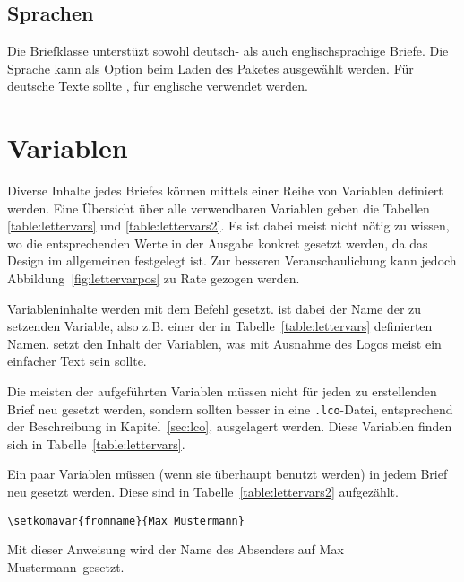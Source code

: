 \subsection{Sprachen}

\begin{Declaration}
\end{Declaration}

Die Briefklasse unterstüzt sowohl deutsch- als auch englischsprachige Briefe.
Die Sprache kann als Option beim Laden des Paketes  ausgewählt werden.
Für deutsche Texte sollte , für englische 
verwendet werden.


\section{Variablen}\label{sec:lettervars}

Diverse Inhalte jedes Briefes können mittels einer Reihe von Variablen
definiert werden.
Eine Übersicht über alle verwendbaren Variablen geben die
Tabellen \ref{table:lettervars} und \ref{table:lettervars2}.
Es ist dabei meist nicht nötig zu wissen,
wo die entsprechenden Werte in der Ausgabe konkret gesetzt werden,
da das Design im allgemeinen festgelegt ist.
Zur besseren Veranschaulichung kann jedoch
Abbildung~\ref{fig:lettervarpos} zu Rate gezogen werden.

\begin{Declaration}
\end{Declaration}

Variableninhalte werden mit dem Befehl  gesetzt.
 ist dabei der Name der zu setzenden Variable, also z.B. einer der in
Tabelle~\ref{table:lettervars} definierten Namen.  setzt den
Inhalt der Variablen, was mit Ausnahme des Logos meist ein einfacher
Text sein sollte.

Die meisten der aufgeführten Variablen müssen nicht für jeden zu erstellenden
Brief neu gesetzt werden, sondern sollten besser in eine \texttt{.lco}-Datei,
entsprechend der Beschreibung in Kapitel~\ref{sec:lco}, ausgelagert werden.
Diese Variablen finden sich in Tabelle~\ref{table:lettervars}.

Ein paar Variablen müssen (wenn sie überhaupt benutzt werden) in jedem Brief
neu gesetzt werden. Diese sind in Tabelle~\ref{table:lettervars2} aufgezählt.

\begin{example}
\begin{lstlisting}
\setkomavar{fromname}{Max Mustermann}
\end{lstlisting}
Mit dieser Anweisung wird der Name des Absenders auf \glqq Max Mustermann\grqq\ 
gesetzt.
\end{example}


